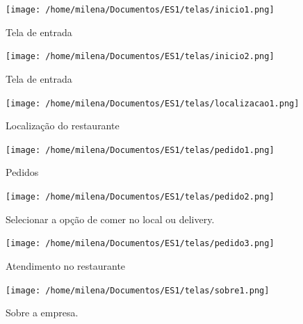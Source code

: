 \documentclass[12pt, a4paper]{article}
\begin{document}
\begin{figure}[htb]
	\caption{Tela de entrada}
	
	\centering %
	\texttt{[image: /home/milena/Documentos/ES1/telas/inicio1.png]} %
	
\end{figure}

\begin{figure}[htb]
	\caption{Tela de entrada}
	
	\centering %
	\texttt{[image: /home/milena/Documentos/ES1/telas/inicio2.png]} %
	
\end{figure}

\begin{figure}[htb]
	\caption{Localização do restaurante}
	
	\centering %
	\texttt{[image: /home/milena/Documentos/ES1/telas/localizacao1.png]} %
	
\end{figure}

\begin{figure}[htb]
	\caption{Pedidos}
	
	\centering %
	\texttt{[image: /home/milena/Documentos/ES1/telas/pedido1.png]} %
	
\end{figure}

\begin{figure}[htb]
	\caption{Selecionar a opção de comer no local ou delivery.}
	
	\centering %
	\texttt{[image: /home/milena/Documentos/ES1/telas/pedido2.png]} %
	
\end{figure}

\begin{figure}[htb]
	\caption{Atendimento no restaurante}
	
	\centering %
	\texttt{[image: /home/milena/Documentos/ES1/telas/pedido3.png]} %
	
\end{figure}

\begin{figure}[htb]
	\caption{Sobre a empresa.}
	
	\centering %
	\texttt{[image: /home/milena/Documentos/ES1/telas/sobre1.png]} %
	
\end{figure}
\end{document}
